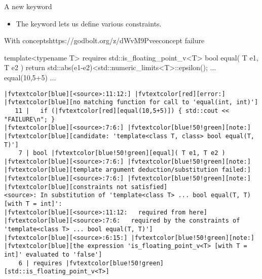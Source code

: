 \begin{frame}[fragile]
  \begin{block}{A new keyword}
    \begin{itemize}
      \item The keyword  lets us define various constraints.
    \end{itemize}
  \end{block}
  \begin{exampleblockGB}{With concepts}{https://godbolt.org/z/dWvM9Pvee}{concept failure}
    \scriptsize
    \begin{cppcode*}{}
    template<typename T>
    requires std::is_floating_point_v<T>
    bool equal( T e1, T e2 ) {
      return std::abs(e1-e2)<std::numeric_limits<T>::epsilon();
    }
    ... equal(10,5+5) ...
    \end{cppcode*}
    \pause
    \tiny
    \begin{Verbatim}[commandchars=\|\[\]]
|fvtextcolor[blue][<source>:11:12:] |fvtextcolor[red][error:] |fvtextcolor[blue][no matching function for call to 'equal(int, int)']
   11 |   if (|fvtextcolor[red][equal(10,5+5)]) { std::cout << "FAILURE\n"; }
|fvtextcolor[blue][<source>:7:6:] |fvtextcolor[blue!50!green][note:] |fvtextcolor[blue][candidate: 'template<class T, class> bool equal(T, T)']
    7 | bool |fvtextcolor[blue!50!green][equal]( T e1, T e2 )
|fvtextcolor[blue][<source>:7:6:] |fvtextcolor[blue!50!green][note:]   |fvtextcolor[blue][template argument deduction/substitution failed:]
|fvtextcolor[blue][<source>:7:6:] |fvtextcolor[blue!50!green][note:] |fvtextcolor[blue][constraints not satisfied]
<source>: In substitution of 'template<class T> ... bool equal(T, T) [with T = int]':
|fvtextcolor[blue][<source>:11:12:   required from here]
|fvtextcolor[blue][<source>:7:6:   required by the constraints of 'template<class T> ... bool equal(T, T)']
|fvtextcolor[blue][<source>:6:15:] |fvtextcolor[blue!50!green][note:] |fvtextcolor[blue][the expression 'is_floating_point_v<T> [with T = int]' evaluated to 'false']
    6 | requires |fvtextcolor[blue!50!green][std::is_floating_point_v<T>]
    \end{Verbatim}
  \end{exampleblockGB}
\end{frame}

